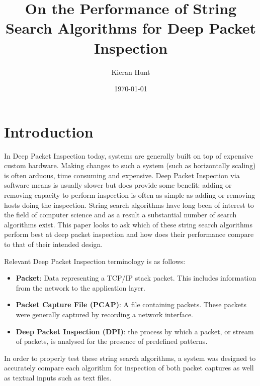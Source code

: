 \documentclass[11pt]{article}
\begin{document}
\title{On the Performance of String Search Algorithms for Deep Packet Inspection}
\author{Kieran Hunt}
\date{\today}
\maketitle

\section{Introduction}

In Deep Packet Inspection today, systems are generally built on top of expensive custom hardware. Making changes to such a system (such as horizontally scaling) is often arduous, time consuming and expensive. Deep Packet Inspection via software means is usually slower but does provide some benefit: adding or removing capacity to perform inspection is often as simple as adding or removing hosts doing the inspection. String search algorithms have long been of interest to the field of computer science and as a result a substantial number of search algorithms exist. This paper looks to ask which of these string search algorithms perform best at deep packet inspection and how does their performance compare to that of their intended design.

Relevant Deep Packet Inspection terminology is as follows:
\begin{itemize}
  \item \textbf{Packet}: Data representing a TCP/IP stack packet. This includes information from the network to the application layer.
  \item \textbf{Packet Capture File (PCAP)}: A file containing packets. These packets were generally captured by recording a network interface.
  \item \textbf{Deep Packet Inspection (DPI)}: the process by which a packet, or stream of packets, is analysed for the presence of predefined patterns.
\end{itemize}

In order to properly test these string search algorithms, a system was designed to accurately compare each algorithm for inspection of both packet captures as well as textual inputs such as text files.
\end{document}
